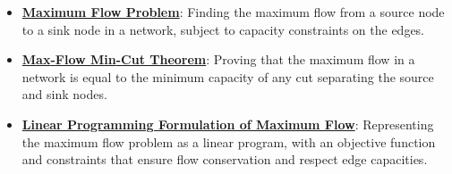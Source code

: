 \documentclass{article}%
\begin{document}
\begin{itemize}[leftmargin=*]%
\item \href{https://www.math.purdue.edu/~yipn/421/2024-11-19-MaxFlowMinCut.pdf#page=1}{\textbf{Maximum Flow Problem}}: Finding the maximum flow from a source node to a sink node in a network, subject to capacity constraints on the edges.%
\item \href{https://www.math.purdue.edu/~yipn/421/2024-11-19-MaxFlowMinCut.pdf#page=8}{\textbf{Max{-}Flow Min{-}Cut Theorem}}: Proving that the maximum flow in a network is equal to the minimum capacity of any cut separating the source and sink nodes.%
\item \href{https://www.math.purdue.edu/~yipn/421/2024-11-19-MaxFlowMinCut.pdf#page=14}{\textbf{Linear Programming Formulation of Maximum Flow}}: Representing the maximum flow problem as a linear program, with an objective function and constraints that ensure flow conservation and respect edge capacities.%
\end{itemize}

%
\end{document}
